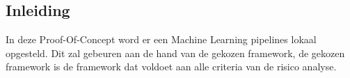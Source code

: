 \chapter{}%
\label{ch:PoC}

\section{Inleiding}
In deze Proof-Of-Concept word er een Machine Learning pipelines lokaal opgesteld. Dit zal gebeuren aan de hand van de gekozen framework, de gekozen framework is de framework dat voldoet aan alle criteria van de risico analyse.